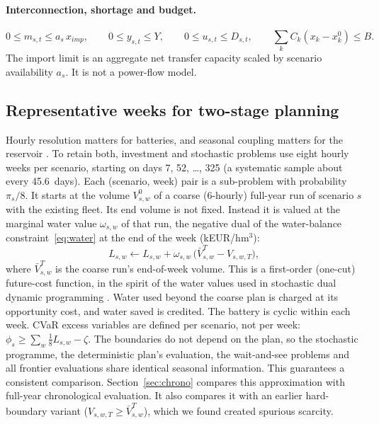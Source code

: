\paragraph{Interconnection, shortage and budget.}
\begin{equation}
0\le m_{s,t}\le a_s\,x_{imp},\qquad 0\le y_{s,t}\le Y,\qquad 0\le u_{s,t}\le D_{s,t},\qquad
\sum_k C_k(x_k-x_k^0)\le B .
\label{eq:imports}
\end{equation}
The import limit is an aggregate net transfer capacity scaled by scenario availability $a_s$. It is not a
power-flow model.

\subsection{Representative weeks for two-stage planning}
Hourly resolution matters for batteries, and seasonal coupling matters for the reservoir
\cite{poncelet2016temporal,kotzur2018seasonal}. To retain both, investment and stochastic problems use eight
hourly weeks per scenario, starting on days 7, 52, \dots, 325 (a systematic sample about every 45.6~days). Each
(scenario, week) pair is a sub-problem with probability $\pi_s/8$. It starts at the volume $V^0_{s,w}$ of a coarse
(6-hourly) full-year run of scenario $s$ with the existing fleet. Its end volume is not fixed. Instead it is
valued at the marginal water value $\omega_{s,w}$ of that run, the negative dual of the water-balance
constraint~\eqref{eq:water} at the end of the week (kEUR/hm$^3$):
\begin{equation}
L_{s,w} \leftarrow L_{s,w} + \omega_{s,w}\,\big(\bar V^T_{s,w} - V_{s,w,T}\big),
\label{eq:watervalue}
\end{equation}
where $\bar V^T_{s,w}$ is the coarse run's end-of-week volume. This is a first-order (one-cut) future-cost
function, in the spirit of the water values used in stochastic dual dynamic programming \cite{pereira1991sddp}.
Water used beyond the coarse plan is charged at its opportunity cost, and water saved is credited. The battery is
cyclic within each week. CVaR excess variables are defined per scenario, not per week:
$\phi_s\ge\sum_{w}\tfrac{1}{8}L_{s,w}-\zeta$. The boundaries do not depend on the plan, so the stochastic
programme, the deterministic plan's evaluation, the wait-and-see problems and all frontier evaluations share
identical seasonal information. This guarantees a consistent comparison. Section~\ref{sec:chrono} compares
this approximation with full-year chronological evaluation. It also compares it with an earlier hard-boundary
variant ($V_{s,w,T}\ge\bar V^T_{s,w}$), which we found created spurious scarcity.

